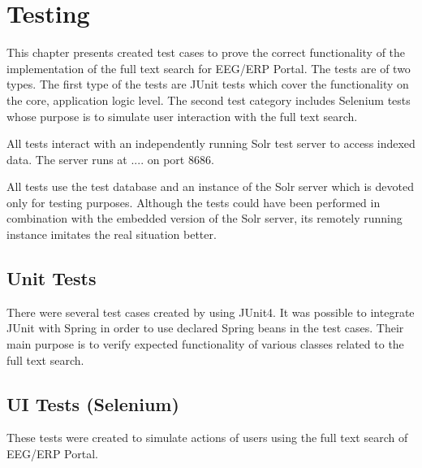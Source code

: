 \chapter{Testing}

This chapter presents created test cases to prove the correct functionality of the implementation of the full text search for EEG/ERP Portal. The tests are of two types. The first type of the tests are JUnit tests which cover the functionality on the core, application logic level. The second test category includes Selenium tests whose purpose is to simulate user interaction with the full text search.

All tests interact with an independently running Solr test server to access indexed data. The server runs at .... on port 8686.

All tests use the test database and an instance of the Solr server which is devoted only for testing purposes.
Although the tests could have been performed in combination with the embedded version of the Solr server, its remotely running instance imitates the real situation better.



\section{Unit Tests}

There were several test cases created by using JUnit4. It was possible to integrate JUnit with Spring in order to use declared Spring beans in the test cases. 
Their main purpose is to verify expected functionality of various classes related to the full text search.


\section{UI Tests (Selenium)}

These tests were created to simulate actions of users using the full text search of EEG/ERP Portal. 

